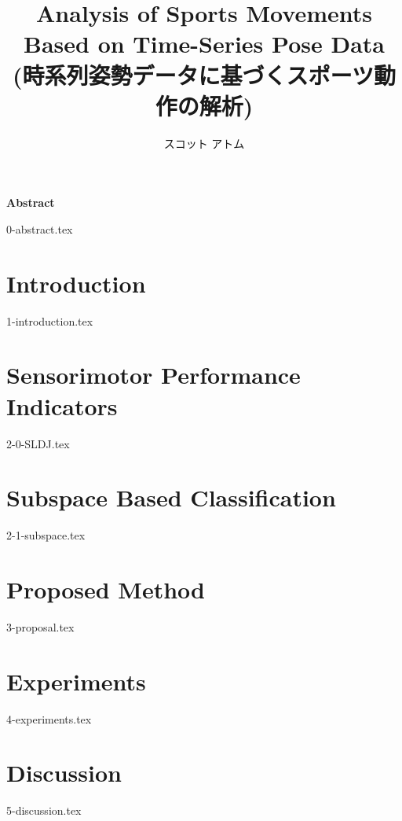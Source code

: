 \documentclass[a4paper,11pt]{report}
\title{Analysis of Sports Movements Based on Time-Series Pose Data \\ (時系列姿勢データに基づくスポーツ動作の解析)}
\author{スコット アトム}
\begin{document}
\maketitle
\thispagestyle{empty}
\newpage

\thispagestyle{empty}
\vspace*{20pt plus 1fil}
\noindent
\begin{center}
  {\Large \bf Abstract}
  \vspace{2cm}
\end{center}

{0-abstract.tex}
\par
\vspace{0pt plus 1fil}
\newpage

\tableofcontents
\listoffigures
\listoftables

\pagebreak \setcounter{page}{1}

\chapter{Introduction}
{1-introduction.tex}

\chapter{Sensorimotor Performance Indicators}
{2-0-SLDJ.tex}

\chapter{Subspace Based Classification}
{2-1-subspace.tex}

\chapter{Proposed Method}
{3-proposal.tex}

\chapter{Experiments}
{4-experiments.tex}

\chapter{Discussion}
{5-discussion.tex}
\end{document}
